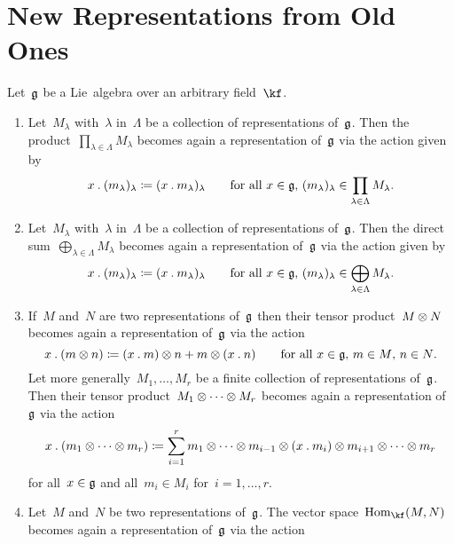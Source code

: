\section{New Representations from Old Ones}


\begin{proposition}
  \label{new representations from old ones}
  Let~$\mathfrak{g}$ be a Lie~algebra over an arbitrary field~$\kf$.
  \begin{enumerate}
    \item
      Let~$M_\lambda$ with~$\lambda$ in~$\Lambda$ be a collection of representations of~$\mathfrak{g}$.
      Then the product~$\prod_{\lambda \in \Lambda} M_\lambda$ becomes again a representation of~$\mathfrak{g}$ via the action given by
      \[
        x \mathbin{.} (m_\lambda)_\lambda
        \coloneqq
        ( x \mathbin{.} m_\lambda )_\lambda
        \qquad
        \text{for all~$x \in \mathfrak{g}$,~$(m_\lambda)_\lambda \in \prod_{\lambda \in \Lambda} M_\lambda$.}
      \]
    \item
      Let~$M_\lambda$ with~$\lambda$ in~$\Lambda$ be a collection of representations of~$\mathfrak{g}$.
      Then the direct sum~$\bigoplus_{\lambda \in \Lambda} M_\lambda$ becomes again a representation of~$\mathfrak{g}$ via the action given by
      \[
        x \mathbin{.} (m_\lambda)_\lambda
        \coloneqq
        ( x \mathbin{.} m_\lambda )_\lambda
        \qquad
        \text{for all~$x \in \mathfrak{g}$,~$(m_\lambda)_\lambda \in \bigoplus_{\lambda \in \Lambda} M_\lambda$.}
      \]
    \item
      If~$M$ and~$N$ are two representations of~$\mathfrak{g}$ then their tensor product~$M \otimes N$ becomes again a representation of~$\mathfrak{g}$ via the action
      \[
        x \mathbin{.} (m \otimes n)
        \coloneqq
        (x \mathbin{.} m) \otimes n + m \otimes (x \mathbin{.} n)
        \qquad
        \text{for all~$x \in \mathfrak{g}$,~$m \in M$,~$n \in N$.}
      \]
      Let more generally~$M_1, \dotsc, M_r$ be a finite collection of representations of~$\mathfrak{g}$.
      Then their tensor product~$M_1 \otimes \dotsb \otimes M_r$ becomes again a representation of~$\mathfrak{g}$ via the action
      \[
        x \mathbin{.} (m_1 \otimes \dotsb \otimes m_r)
        \coloneqq
        \sum_{i=1}^r
                m_1
        \otimes \dotsb
        \otimes m_{i-1}
        \otimes (x \mathbin{.} m_i)
        \otimes m_{i+1}
        \otimes \dotsb
        \otimes m_r
      \]
      for all~$x \in \mathfrak{g}$ and all~$m_i \in M_i$ for~$i = 1, \dotsc, r$.
    \item
      Let~$M$ and~$N$ be two representations of~$\mathfrak{g}$.
      The vector space~$\Hom_{\kf}(M,N)$ becomes again a representation of~$\mathfrak{g}$ via the action

\end{enumerate}
\end{proposition}
